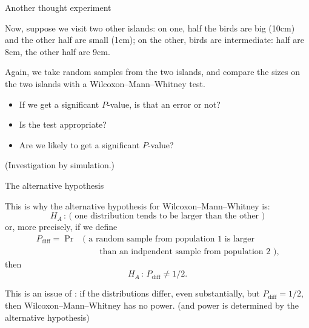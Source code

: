 \begin{frame}{Another thought experiment}

  Now, suppose we visit two other islands:
  on one, half the birds are big (10cm) and the other half are small (1cm);
  on the other, birds are intermediate: half are 8cm, the other half are 9cm.

  \vspace{2em}

  Again, we take random samples from the two islands,
  and compare the sizes on the two islands with a Wilcoxon--Mann--Whitney test.
  \begin{itemize}
    \item If we get a significant $P$-value, is that an error or not?
    \item Is the test appropriate?
    \item Are we likely to get a significant $P$-value?
  \end{itemize}

  \vspace{2em}
  \pause

  (Investigation by simulation.)

\end{frame}

\begin{frame}{The alternative hypothesis}

  This is why the alternative hypothesis for Wilcoxon--Mann--Whitney is:
  \[  H_A \, : \, \text{( one distribution tends to be larger than the other )} \]
  or, more precisely, if we define
  \begin{align*}
    P_\text{diff} = \Pr & \text{( a random sample from population 1 is larger} \\
      & \qquad \text{than an indpendent sample from population 2 )} , 
  \end{align*}
  then
  \[  H_A \, : \, P_\text{diff} \neq 1/2 .\]

  \vspace{2em}

  This is an issue of :
  if the distributions differ, even substantially,
  but $P_\text{diff}=1/2$,
  then Wilcoxon--Mann--Whitney has \alert{no power}.
  (and power is determined by the alternative hypothesis)

\end{frame}



